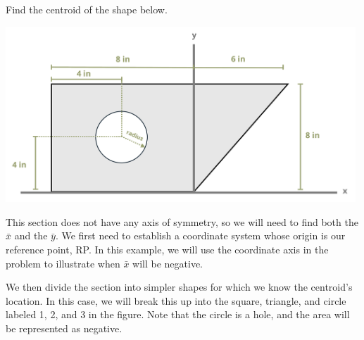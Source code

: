 \documentclass[
  letterpaper,
  DIV=11,
  numbers=noendperiod]{scrreprt}
\theoremstyle{definition}
\theoremstyle{remark}
\begin{document}
\begin{tcolorbox}[enhanced jigsaw, leftrule=.75mm, colbacktitle=quarto-callout-tip-color!10!white, breakable, opacityback=0, colback=white, titlerule=0mm, toprule=.15mm, colframe=quarto-callout-tip-color-frame, coltitle=black, title={Example 8.3}, toptitle=1mm, bottomrule=.15mm, rightrule=.15mm, left=2mm, arc=.35mm, opacitybacktitle=0.6, bottomtitle=1mm]

Find the centroid of the shape below.

\begin{center}
\includegraphics[width=5.17708in,height=\textheight]{images/CH 8 PNGs/example 8.3 part 1.png}
\end{center}

\begin{tcolorbox}[enhanced jigsaw, leftrule=.75mm, colbacktitle=quarto-callout-tip-color!10!white, breakable, opacityback=0, colback=white, titlerule=0mm, toprule=.15mm, colframe=quarto-callout-tip-color-frame, coltitle=black, title={Solution}, toptitle=1mm, bottomrule=.15mm, rightrule=.15mm, left=2mm, arc=.35mm, opacitybacktitle=0.6, bottomtitle=1mm]

This section does not have any axis of symmetry, so we will need to find
both the \(\bar{x}\) and the \(\bar{y}\). We first need to establish a
coordinate system whose origin is our reference point, RP. In this
example, we will use the coordinate axis in the problem to illustrate
when \(\bar{x}\) will be negative.

We then divide the section into simpler shapes for which we know the
centroid's location. In this case, we will break this up into the
square, triangle, and circle labeled 1, 2, and 3 in the figure. Note
that the circle is a hole, and the area will be represented as negative.


\end{tcolorbox}
\end{tcolorbox}
\end{document}
